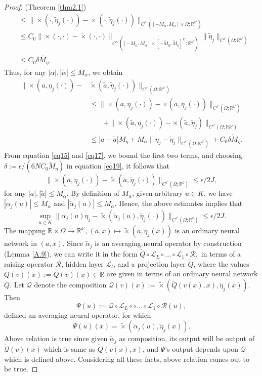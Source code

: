 \documentclass[reqno]{amsart}
\theoremstyle{plain}
\theoremstyle{definition}
\newcommand{\bb}[1]{\mathbb{#1}}
\newcommand{\cal}[1]{\mathcal{#1}}
\begin{document}
\begin{proof}{(Theorem \ref{thm2.1})}
$$\begin{aligned}
        &\leq \|\times(\cdot,\tilde{\eta}_j(\cdot)) - \tilde{\times}(\cdot,\tilde{\eta}_j(\cdot))\|_{C^{s'}([-M_\alpha,M_\alpha] \times \Omega;\bb R^{k'})}\\
        &\leq C_0\|\times(\cdot,\cdot) - \tilde{\times}(\cdot,\cdot)\|_{C^{s'}([-M_\alpha,M_\alpha]\times [-\tilde{M}_\eta,\tilde{M}_\eta]^{k'};\bb R^{k'})} \|\tilde{\eta}_j\|_{C^{s'}(\Omega;\bb R^{k'})}\\
        &\leq C_0 \delta \tilde{M_\eta}.
    \end{aligned}
    $$
    Thus, for any $|\alpha|, |\tilde{\alpha}| \leq M_\alpha$, we obtain
    $$
    \begin{aligned}
        \|\times (a,\eta_j(\cdot)) - &\tilde{\times}(\tilde{a},\tilde{\eta}_j(\cdot))\|_{C^{s'}(\Omega;\bb R^{k'})}\\
        &\leq \|\times (a,\eta_j(\cdot)) - \times(\tilde{a},\eta_j(\cdot))\|_{C^{s'}(\Omega;\bb R^{k'})}\\
        & \qquad + \|\times(\tilde{a},\eta_j(\cdot)) - \times(\tilde{a},\tilde{\eta}_j)\|_{C^{s'}(\Omega;\bb R{k'})}\\
        & \leq |a-\tilde{a}|M_\eta + M_\alpha\|\eta_j - \tilde{\eta}_j\|_{C^{s'}(\Omega;\bb R^{k'})} + C_0\delta\tilde{M}_\eta.
    \end{aligned}
    $$
From equation \ref{eq15} and \ref{eq17}, we bound the first two terms, and choosing $\delta := \epsilon/(6NC_0\tilde{M}_\eta)$ in equation \ref{eq19}, it follows that 
$$ \|\times(a,\eta_j(\cdot)) - \tilde{\times}(\tilde{a},\tilde{\eta}_j(\cdot))\|_{C^{s'}(\Omega;\bb R^k)} \leq \epsilon/2J,$$
for any $|a|,|\tilde{a}| \leq M_\alpha$. By definition of $M_\alpha$, given arbitrary $u \in K$, we have $|\alpha_j(u)| \leq M_\alpha$ and $|\tilde{\alpha}_j(u)| \leq M_\alpha.$ Hence, the above estimates implies that 
\begin{equation}\label{eq20}
    \sup_{u \in K}\|\alpha_j(u)\eta_j - \tilde{\times}(\tilde{\alpha}_j(u),\tilde{\eta}_j(\cdot))\|_{C^{s'}(\Omega;\bb R^k)} \leq \epsilon/2J.
\end{equation}
The mapping $\bb R\times \Omega \to \bb R^{k'}, (a,x)\mapsto \tilde{\times}(a,\tilde{\eta}_j(x))$ is an ordinary neural network in $(a,x)$. Since $\tilde{\alpha}_j$ is an averaging neural operator by construction (Lemma \ref{A.9}), we can write it in the form $\tilde{Q}\circ\cal L_L \circ\dots\circ\cal L_1 \circ \cal R,$ in terms of a raising operator $\cal R$, hidden layer $\cal L_l$, and a projection layer $\tilde{Q}$, where the values $\tilde{Q}(v)(x) := \tilde{Q}(v)(x) \in \bb R$ are given in terms of an ordinary neural network $\tilde{Q}.$ Let $\cal Q$ denote the composition $\cal Q(v)(x) := \tilde{\times}(\tilde{Q}(v(x),x),\tilde{\eta}_j(x)).$ Then
$$ \Psi(u) := \cal Q \circ \cal L_L\circ \circ \dots \circ \cal L_1 \circ \cal R(u),$$
defined an averaging neural operator, for which
$$ \Psi(u)(x) = \tilde{\times}(\tilde{\alpha}_j(u),\tilde{\eta}_j(x)).$$
Above relation is true since given $\tilde{\alpha}_j$ as composition, its output will be output of $\tilde{\cal Q}(v)(x)$ which is same as $\tilde{Q}(v(x),x)$, and $\Psi$'s output depends upon $\cal Q$ which is defined above. Considering all these facts, above relation comes out to be true.


\end{proof}
\end{document}
